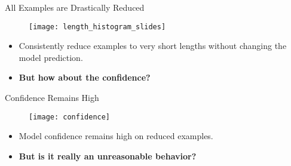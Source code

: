 \begin{frame}{All Examples are Drastically Reduced}
\begin{figure}
\centering
\texttt{[image: length\_histogram\_slides]}
\end{figure}
\begin{itemize}
\item Consistently reduce examples to very short lengths without changing the model prediction. \pause
\item \textbf{But how about the confidence?}
\end{itemize}
\end{frame}

\begin{frame}{Confidence Remains High}
\begin{figure}
\centering
\texttt{[image: confidence]}
\end{figure}
\begin{itemize}
\item Model confidence remains high on reduced examples. \pause
\item \textbf{But is it really an unreasonable behavior?}
\end{itemize}
\end{frame}

